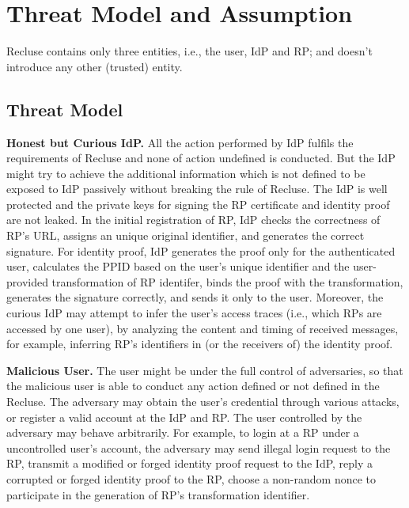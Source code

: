\section{Threat Model and Assumption}
\label{sec:assumptionandthreatmodel}
Recluse contains only three entities, i.e., the user, IdP and RP; and doesn't introduce any other (trusted) entity. 


\subsection{Threat Model}

\textbf{Honest but Curious IdP.} All the action performed by IdP fulfils the requirements of Recluse and none of action undefined is conducted. 
But the IdP might try to achieve the additional information which is not defined to be exposed to IdP passively without breaking the rule of Recluse.
The IdP is well protected and the private keys for signing the RP certificate and identity proof are not leaked. In the initial registration of RP,  IdP checks the correctness of RP's URL,  assigns an unique original identifier, and generates the correct signature. For identity proof, IdP generates the proof only for the authenticated user, calculates the PPID based on the user's unique identifier and the user-provided transformation of RP identifer, binds the proof with the transformation, generates the signature correctly, and sends it only to the user. Moreover, the curious IdP may attempt to infer the user's access traces (i.e., which RPs are accessed by one user), by analyzing the content and timing of received messages, for example, inferring RP's identifiers in (or the receivers of) the identity proof. 

\textbf{Malicious User.} The user might be under the full control of adversaries, so that the malicious user is able to conduct any action defined or not defined in the Recluse. 
The adversary may obtain the user's credential through various attacks, or register a valid account at the IdP and RP. The user controlled by the adversary may behave arbitrarily. For example, to login at a RP under a uncontrolled user's account, the adversary may send illegal login request to the RP, transmit a modified or forged identity proof request to the IdP, reply a corrupted or forged identity proof to the RP,  choose a non-random nonce to participate in the generation of RP's transformation identifier.


